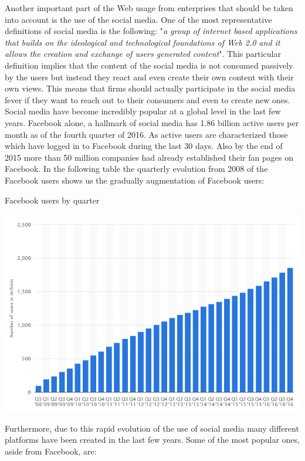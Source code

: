 \documentclass{book}
\begin{document}
Another important part of the Web usage from enterprises that should be taken into account is the use of the social media. One of the most representative definitions\cite{key27} of social media is the following: "\textit{a group of internet based applications that builds on the ideological and technological foundations of Web 2.0 and it allows the creation and exchange of users generated content}". This particular definition implies that the content of the social media is not consumed passively by the users but instead they react and even create their own content with their own views. This means that firms should actually participate in the social media fever if they want to reach out to their consumers and even to create new ones. Social media have become incredibly popular at a global level in the last few years. Facebook alone, a hallmark of social media has 1.86 billion active users per month as of the fourth quarter of 2016.\cite{key21} As active users are characterized those which have logged in to Facebook during the last 30 days. Also by the end of 2015 more than 50 million companies had already established their fan pages on Facebook.\cite{key26} In the following table the quarterly evolution from 2008 of the Facebook users shows us the gradually augmentation of Facebook users:
\begin{table}[H]
\centering
\caption{Facebook users by quarter}
\begin{center}
\includegraphics[scale=0.5]{../R/photos/facebook_q_users.png}   
\end{center}
\end{table}
Furthermore, due to this rapid evolution of the use of social media many different platforms have been created in the last few years. Some of the most popular ones, aside from Facebook, are:
\end{document}
